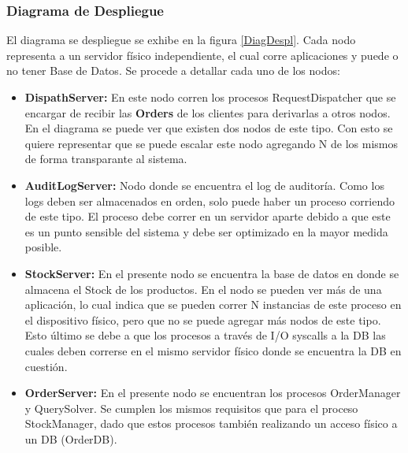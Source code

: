 \documentclass[a4paper,10pt]{article}
\begin{document}
        \subsubsection{Diagrama de Despliegue}
        El diagrama se despliegue se exhibe en la figura \ref{DiagDespl}. Cada 
        nodo representa a un servidor físico independiente, el cual corre 
        aplicaciones y puede o no tener Base de Datos. Se procede a detallar
        cada uno de los nodos:

        \begin{itemize}
            \item \textbf{DispathServer:} En este nodo corren los procesos
            RequestDispatcher que se encargar de recibir las \textbf{Orders}
            de los clientes para derivarlas a otros nodos. En el diagrama
            se puede ver que existen dos nodos de este tipo. Con esto se 
            quiere representar que se puede escalar este nodo agregando
            N de los mismos de forma transparante al sistema.
            \item \textbf{AuditLogServer:} Nodo donde se encuentra el log 
            de auditoría. Como los logs deben ser almacenados en orden, 
            solo puede haber un proceso corriendo de este tipo. El proceso
            debe correr en un servidor aparte debido a que este es un punto
            sensible del sistema y debe ser optimizado en la mayor medida
            posible.
            \item \textbf{StockServer:} En el presente nodo se encuentra 
            la base de datos en donde se almacena el Stock de los productos.
            En el nodo se pueden ver más de una aplicación, lo cual indica
            que se pueden correr N instancias de este proceso en el dispositivo
            físico, pero que no se puede agregar más nodos de este tipo. Esto
            último se debe a que los procesos a través de I/O syscalls a la 
            DB las cuales deben correrse en el mismo servidor físico donde
            se encuentra la DB en cuestión.
            \item \textbf{OrderServer:} En el presente nodo se encuentran los
            procesos OrderManager y QuerySolver. Se cumplen los mismos 
            requisitos que para el proceso StockManager, dado que estos 
            procesos también realizando un acceso físico a un DB (OrderDB).
           
        \end{itemize}
\end{document}
